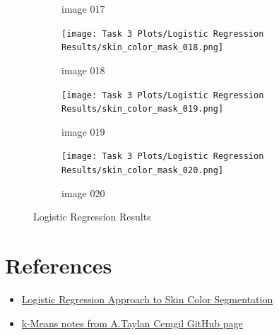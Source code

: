 \documentclass[11pt]{report}
\begin{document}
\begin{figure}
\begin{subfigure}{0.24\textwidth}
        \caption{image 017}
        \label{fig:lskincolormask17}
    \end{subfigure}
    \begin{subfigure}{0.24\textwidth}
        \centering
        \texttt{[image: Task 3 Plots/Logistic Regression Results/skin\_color\_mask\_018.png]}
        \caption{image 018}
        \label{fig:lskincolormask18}
    \end{subfigure}
    \begin{subfigure}{0.24\textwidth}
        \centering
        \texttt{[image: Task 3 Plots/Logistic Regression Results/skin\_color\_mask\_019.png]}
        \caption{image 019}
        \label{fig:lskincolormask19}
    \end{subfigure}
    \begin{subfigure}{0.24\textwidth}
        \centering
        \texttt{[image: Task 3 Plots/Logistic Regression Results/skin\_color\_mask\_020.png]}
        \caption{image 020}
        \label{fig:lskincolormask20}
    \end{subfigure}
    
    \caption{Logistic Regression Results}
    \label{fig:logregressionall}
\end{figure}

\chapter{References}

\begin{itemize}
    \item \href{https://staff.fnwi.uva.nl/r.vandenboomgaard/IPCV20162017/20162017/LabExercises/SkinColorDetection.html}{Logistic Regression Approach to Skin Color Segmentation}
    \item \href{https://github.com/atcemgil/notes/blob/master/Kmeans.ipynb}{k-Means notes from A.Taylan Cemgil GitHub page}
\end{itemize}
\end{document}
